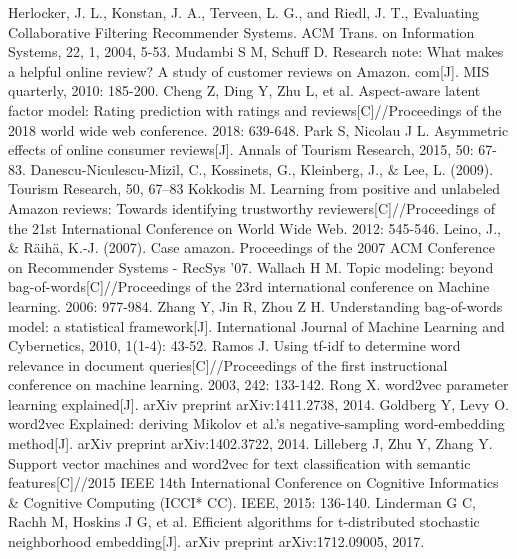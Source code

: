 \documentclass[12pt]{article}%
\begin{document}
	
\newpage
\setmainfont{Times New Roman}
\fancyhf{}
\nocite{*}		
\begin{thebibliography}{9}
	Herlocker, J. L., Konstan, J. A., Terveen, L. G., and Riedl, J. T., Evaluating Collaborative Filtering Recommender Systems. ACM Trans. on Information Systems, 22, 1, 2004, 5-53.
	Mudambi S M, Schuff D. Research note: What makes a helpful online review? A study of customer reviews on Amazon. com[J]. MIS quarterly, 2010: 185-200.
	Cheng Z, Ding Y, Zhu L, et al. Aspect-aware latent factor model: Rating prediction with ratings and reviews[C]//Proceedings of the 2018 world wide web conference. 2018: 639-648.
	Park S, Nicolau J L. Asymmetric effects of online consumer reviews[J]. Annals of Tourism Research, 2015, 50: 67-83.
	 Danescu-Niculescu-Mizil, C., Kossinets, G., Kleinberg, J., $\&$ Lee, L. (2009).
	Tourism Research, 50, 67–83
	 Kokkodis M. Learning from positive and unlabeled Amazon reviews: Towards identifying trustworthy reviewers[C]//Proceedings of the 21st International Conference on World Wide Web. 2012: 545-546.
	Leino, J., $\&$ Räihä, K.-J. (2007). Case amazon. Proceedings of the 2007 ACM Conference on Recommender Systems - RecSys ’07.
	Wallach H M. Topic modeling: beyond bag-of-words[C]//Proceedings of the 23rd international conference on Machine learning. 2006: 977-984.
	Zhang Y, Jin R, Zhou Z H. Understanding bag-of-words model: a statistical framework[J]. International Journal of Machine Learning and Cybernetics, 2010, 1(1-4): 43-52.
	Ramos J. Using tf-idf to determine word relevance in document queries[C]//Proceedings of the first instructional conference on machine learning. 2003, 242: 133-142.
	Rong X. word2vec parameter learning explained[J]. arXiv preprint arXiv:1411.2738, 2014.
	Goldberg Y, Levy O. word2vec Explained: deriving Mikolov et al.'s negative-sampling word-embedding method[J]. arXiv preprint arXiv:1402.3722, 2014.
	Lilleberg J, Zhu Y, Zhang Y. Support vector machines and word2vec for text classification with semantic features[C]//2015 IEEE 14th International Conference on Cognitive Informatics \& Cognitive Computing (ICCI* CC). IEEE, 2015: 136-140.
	Linderman G C, Rachh M, Hoskins J G, et al. Efficient algorithms for t-distributed stochastic neighborhood embedding[J]. arXiv preprint arXiv:1712.09005, 2017.

\end{thebibliography}
\end{document}
